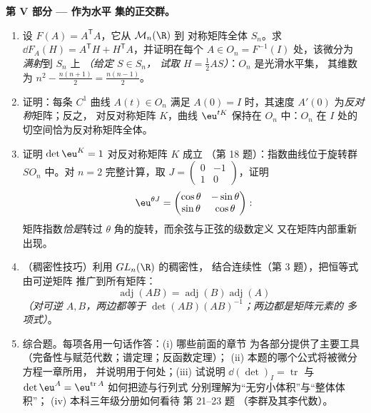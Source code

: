 \begin{problem}
\medskip
\noindent\textbf{第 V 部分 --- 作为水平
集的正交群。}
\begin{enumerate}[resume]
  \item 设 $F(A) = A^{\mathsf T}A$，它从 $\mathcal M_n(\R)$ 到
        对称矩阵全体 $S_n$。求 $\dd F_A(H) =
        A^{\mathsf T}H + H^{\mathsf T}A$，并证明在每个
        $A \in O_n = F^{-1}(I)$ 处，该微分为
        \emph{满射}到 $S_n$ 上 \emph{（给定 $S \in S_n$，
        试取 $H = \frac12 AS$）}：$O_n$ 是光滑水平集，
        其维数为 $n^2 - \frac{n(n+1)}2 = \frac{n(n-1)}2$。
  \item 证明：每条 $C^1$ 曲线 $A(t) \in O_n$ 满足 $A(0) =
        I$ 时，其速度 $A'(0)$ 为\emph{反对称}矩阵；反之，
        对反对称矩阵 $K$，曲线
        $\eu^{tK}$ 保持在 $O_n$ 中：$O_n$ 在
        $I$ 处的切空间恰为反对称矩阵全体。
  \item 证明 $\det\eu^{K} = 1$ 对反对称矩阵 $K$ 成立
        （第 18 题）：指数曲线位于旋转群
        $SO_n$ 中。对 $n = 2$ 完整计算，取 $J =
        \begin{pmatrix}0 & -1\\ 1 & 0\end{pmatrix}$，证明
        \[
        \eu^{\theta J} = \begin{pmatrix} \cos\theta &
        -\sin\theta\\ \sin\theta & \cos\theta\end{pmatrix} :
        \]
        矩阵指数\emph{恰是}转过
        $\theta$ 角的旋转，而余弦与正弦的级数定义
        又在矩阵内部重新出现。
  \item （稠密性技巧）利用 $GL_n(\R)$ 的稠密性，
        结合连续性（第 3 题），把恒等式由可逆矩阵
        推广到所有矩阵：
        \[
        \operatorname{adj}(AB) =
        \operatorname{adj}(B)\operatorname{adj}(A)
        \]
        \emph{（对可逆 $A, B$，两边都等于
        $\det(AB)(AB)^{-1}$；两边都是矩阵元素的
        多项式）}。
  \item 综合题。每项各用一句话作答：(i) 哪些前面的章节
        为各部分提供了主要工具
        （完备性与赋范代数；谱定理；反函数定理）；
        (ii) 本题的哪个公式将被微分方程一章所用，
        并说明用于何处；(iii) 试说明
        $\dd(\det)_I = \operatorname{tr}$ 与 $\det\eu^A =
        \eu^{\operatorname{tr}A}$ 如何把迹与行列式
        分别理解为“无穷小体积”与“整体体积”；
        (iv) 本科三年级分册如何看待
        第 21--23 题
        （李群及其李代数）。
\end{enumerate}
\end{problem}
